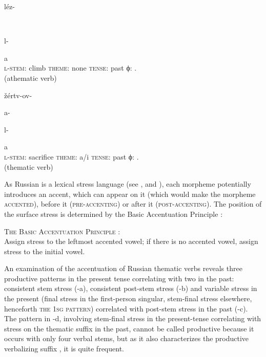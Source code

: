 \documentclass[output=paper,colorlinks,citecolor=black,koreanfont]{langscibook}
\begin{document}
\ea\label{mat:ex:RussianVerb}
\ea\label{mat:ex:RussianVerbA}\gll \parbox{2.65cm}{léz-} \parbox{2.25cm}{~} \parbox{2cm}{l-} a \\
{\textsc{l-stem}: climb} {\textsc{theme}: none} {\textsc{tense}: past} {ϕ: {\FEM.\SG}}\\\hfill (athematic verb)
\z
\ea\gll \parbox{2.65cm}{žértv-ov-} \parbox{2.25cm}{a-} \parbox{2cm}{l-} a \\
{\textsc{l-stem}: sacrifice} {\textsc{theme}: a/i} {\textsc{tense}: past} {ϕ: {\FEM.\SG}}\\\hfill (thematic verb)
\z
\z

\noindent As Russian is a lexical stress language (see \citealt{Zaliznjak1985,Melvold1989,Idsardi1992,Garde1998,Alderete1999,Revithiadou1999,Butska2002}, and \citealt{mat:Dubina2012}), each morpheme potentially introduces an accent, which can appear on it (which would make the morpheme \textsc{accented}), before it (\textsc{pre-accenting}) or after it (\textsc{post-accenting}). The position of the surface stress is determined by the Basic Accentuation Principle :

\ea\label{mat:ex:BAP}
\textsc{The Basic Accentuation Principle} \citep{KiparskyHalle1977}:\\
Assign stress to the leftmost accented vowel; if there is no accented vowel, assign stress to the initial vowel.
\z

\noindent An examination of the accentuation of Russian thematic verbs reveals three productive patterns in the present tense correlating with two in the past: consistent stem stress (-a), consistent post-stem stress (-b) and variable stress in the present (final stress in the first-person singular, stem-final stress elsewhere, henceforth \textsc{the 1sg pattern}) correlated with post-stem stress in the past (-c). The pattern in -d, involving stem-final stress in the present-tense correlating with stress on the thematic suffix in the past, cannot be called productive because it occurs with only four verbal stems, but as it also characterizes the productive verbalizing suffix , it is quite frequent.
\end{document}
